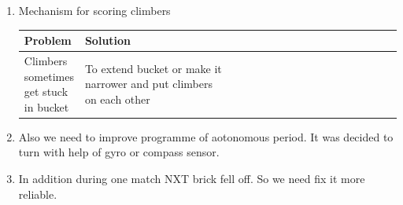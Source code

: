 \begin{enumerate}
	\item Mechanism for scoring climbers 
	\begin{table}[H]
		\vspace{-2mm}
		\begin{center}
			\begin{tabular}{|p{0.15\linewidth}|p{0.4\linewidth}|p{0.55\linewidth}}
				\hline
				Problem & Solution\\
				\hline
				Climbers sometimes get stuck in bucket  & To extend bucket or make it narrower and put climbers on each other  \\	
				\hline
			\end{tabular}
		\end{center}
	\end{table}
	
	\item Also we need to improve programme of aotonomous period. It was decided to turn with help of gyro or compass sensor.
	
	\item In addition during one match NXT brick fell off. So we need fix it more reliable.
	
\end{enumerate}
